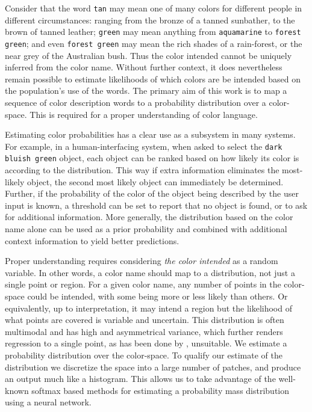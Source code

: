 \documentclass[11pt,a4paper]{article}
\newcommand{\textcite}{\citet}
\begin{document}
Consider that the word \texttt{tan} may mean one of many colors for different people in different circumstances: ranging from the bronze of a tanned sunbather, to the brown of tanned leather;
\texttt{green} may mean anything from \texttt{aquamarine} to \texttt{forest green};
 and even \texttt{forest green} may mean the rich shades of a rain-forest, or the near grey of the Australian bush.
Thus the color intended cannot be uniquely inferred from the color name.
Without further context, it does nevertheless remain possible to estimate likelihoods of which colors are be intended based on the population's use of the words.
The primary aim of this work is to map a sequence of color description words to a probability distribution over a color-space.
This is required for a proper understanding of color language.


Estimating color probabilities has a clear use as a subsystem in many systems.
For example, in a human-interfacing system, when asked to select the \texttt{dark bluish green} object, each object can be ranked based on how likely its color is according to the distribution.
This way if extra information eliminates the most-likely object, the second most likely object can immediately be determined.
Further, if the probability of the color of the object being described by the user input is known, a threshold can be set to report that no object is found, or to ask for additional information.
More generally, the distribution based on the color name alone can be used as a prior probability and combined with additional context information to yield better predictions.


Proper understanding requires considering \emph{the color intended} as a random variable.
In other words, a color name should map to a distribution, not just a single point or region.
For a given color name, any number of points in the color-space could be intended, with some being more or less likely than others.
Or equivalently, up to interpretation, it may intend a region but the likelihood of what points are covered is variable and uncertain.
This distribution is often multimodal and has high and asymmetrical variance, which further renders regression to a single point, as has been done by \textcite{DBLP:journals/corr/KawakamiDRS16}, unsuitable.
We estimate a probability distribution over the color-space.
To qualify our estimate of the distribution we discretize the space into a large number of patches, and produce an output much like a histogram.
This allows us to take advantage of the well-known softmax based methods for estimating a probability mass distribution using a neural network.
\end{document}
